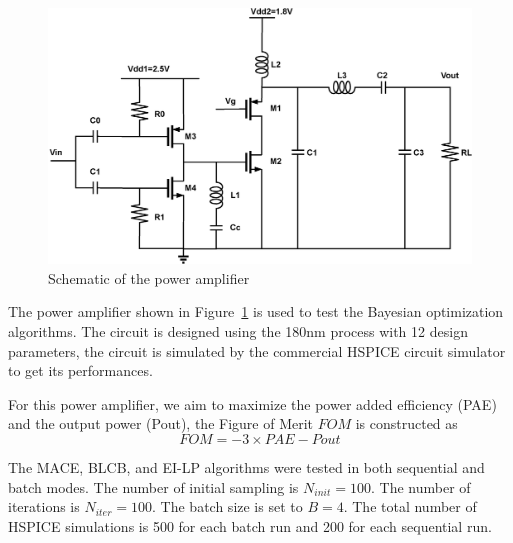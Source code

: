 \begin{figure}[]
    \begin{center}
        \centerline{\includegraphics[width=\columnwidth]{./img/classE.eps}}
        \caption{Schematic of the power amplifier}
        \label{fig:schPA}
    \end{center}
\end{figure}

The power amplifier shown in Figure~\ref{fig:schPA} is used to test the Bayesian optimization algorithms. The
circuit is designed using the 180nm process with 12 design parameters, the
circuit is simulated by the commercial HSPICE circuit simulator to get its performances.

For this power amplifier, we aim to maximize the power added efficiency (PAE) and the output power (Pout), the Figure of Merit $FOM$ is constructed as
$$
\mathit{FOM} = -3 \times \mathit{PAE} - \mathit{Pout}
$$

The MACE, BLCB, and EI-LP algorithms were tested in both sequential and batch
modes. The number of initial sampling is $N_{init} = 100$. The number of
iterations is $N_{iter} = 100$. The batch size is set to $B = 4$. The total
number of HSPICE simulations is 500 for each batch run and 200 for each
sequential run.


